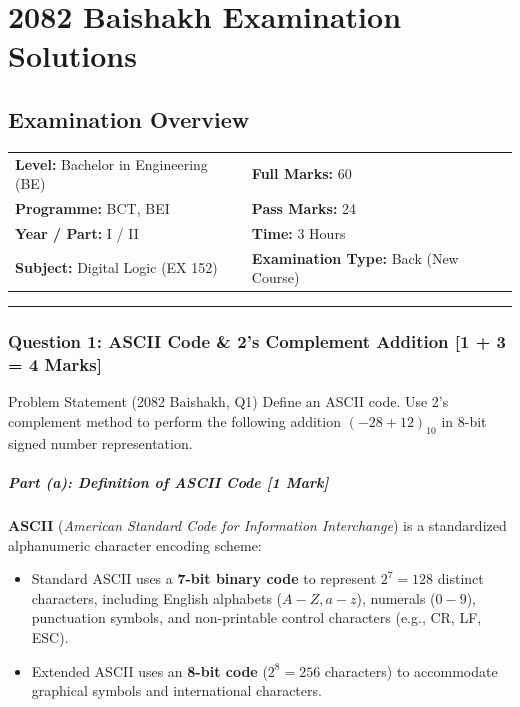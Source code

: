 \documentclass[11pt,a4paper,oneside]{book}
\begin{document}
\chapter{2082 Baishakh Examination Solutions}

\section*{Examination Overview}
\begin{tabular}{@{}ll@{}}
\textbf{Level:} Bachelor in Engineering (BE) & \textbf{Full Marks:} 60 \\
\textbf{Programme:} BCT, BEI & \textbf{Pass Marks:} 24 \\
\textbf{Year / Part:} I / II & \textbf{Time:} 3 Hours \\
\textbf{Subject:} Digital Logic (EX 152) & \textbf{Examination Type:} Back (New Course) \\
\end{tabular}

\vspace{0.6cm}
\hrule
\vspace{0.6cm}

\subsection{Question 1: ASCII Code \& 2's Complement Addition [1 + 3 = 4 Marks]}
\begin{questionbox}{Problem Statement (2082 Baishakh, Q1)}
Define an ASCII code. Use 2's complement method to perform the following addition $(-28 + 12)_{10}$ in 8-bit signed number representation.
\end{questionbox}

\paragraph{Part (a): Definition of ASCII Code [1 Mark]}
\textbf{ASCII} (\textit{American Standard Code for Information Interchange}) is a standardized alphanumeric character encoding scheme:
\begin{itemize}
  \item Standard ASCII uses a \textbf{7-bit binary code} to represent $2^7 = 128$ distinct characters, including English alphabets ($A-Z, a-z$), numerals ($0-9$), punctuation symbols, and non-printable control characters (e.g., CR, LF, ESC).
  \item Extended ASCII uses an \textbf{8-bit code} ($2^8 = 256$ characters) to accommodate graphical symbols and international characters.
\end{itemize}
\end{document}
